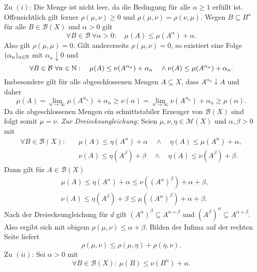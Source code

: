 \begin{proof*}
    Zu $(i)$: Die Menge ist nicht leer, da die Bedingung für alle $\alpha \geq 1$ erfüllt ist. Offensichtlich gilt ferner $\rho(\mu, \nu) \geq 0$ und $\rho(\mu, \nu) = \rho(\nu, \mu)$. 
    Wegen $B \subseteq B^{\alpha}$ für alle $B \in \mathcal{B}(X)$ und $\alpha > 0$ gilt 
    $$
        \forall B \in \mathcal{B} \ \forall \alpha > 0: \quad \mu(A) \leq \mu(A^{\alpha}) + \alpha.
    $$
    Also gilt $\rho(\mu, \mu) = 0$. Gilt andererseits $\rho(\mu, \nu) = 0$, so existiert eine Folge $(\alpha_n)_{n \in \mathbb{N}}$ mit $\alpha_n \downarrow 0$ und
    $$
    \forall B \in \mathcal{B} \ \forall n \in \mathbb{N}: \quad \mu(A) \leq \nu(A^{\alpha_n}) + \alpha_n \quad \land \nu(A) \leq \mu(A^{\alpha_n}) + \alpha_n.
    $$
    Insbesondere gilt für alle abgeschlossenen Mengen $A \subseteq X$, dass $A^{\alpha_n} \downarrow A$ und daher
    $$
        \mu(A) = \lim_{n \to \infty} \mu(A^{\alpha_n}) + \alpha_n \geq \nu(\alpha) = \lim_{n \to \infty} \nu(A^{\alpha_n}) + \alpha_n \geq \mu(\alpha). 
    $$
    Da die abgeschlossenen Mengen ein schnittstabiler Erzeuger von $\mathcal{B}(X)$ sind folgt somit $\mu = \nu$.
    \newline
    \textit{Zur Dreiecksungleichung:} Seien $\mu, \nu, \eta \in \mathcal{M}(X)$ und $\alpha, \beta > 0$ mit 
    \begin{align*}
        \forall B \in \mathcal{B}(X): \quad &\mu(A) \leq \eta(A^{\alpha}) + \alpha \quad \land \quad \eta(A) \leq \mu(A^{\alpha}) + \alpha, \\\
                                            &\nu(A) \leq \eta(A^{\beta}) + \beta \quad \land \quad \eta(A) \leq \nu(A^{\beta}) + \beta.
    \end{align*}
    Dann gilt für $A \in \mathcal{B}(X)$
    \begin{align*}
        &\mu(A) \leq \eta(A^{\alpha}) + \alpha \leq \nu((A^{\alpha})^{\beta}) + \alpha + \beta, \\\
        &\nu(A) \leq \eta(A^{\beta}) + \beta \leq \mu((A^{\alpha})^{\beta}) + \alpha + \beta. 
    \end{align*}
    Nach der Dreiecksungleichung für $d$ gilt $(A^{\alpha})^{\beta} \subseteq A^{\alpha + \beta}$ und $(A^{\beta})^{\alpha} \subseteq A^{\alpha + \beta}$. Also ergibt sich mit obigem $\rho(\mu, \nu) \leq \alpha + \beta$. 
    Bilden der Infima auf der rechten Seite liefert
    $$
        \rho(\mu, \nu) \leq \rho(\mu, \eta) + \rho(\eta, \nu).
    $$
    Zu $(ii)$: Sei $\alpha > 0$ mit 
    $$
        \forall B \in \mathcal{B}(X): \ \mu(B) \leq \nu(B^{\alpha}) + \alpha.
$$
\end{proof*}
